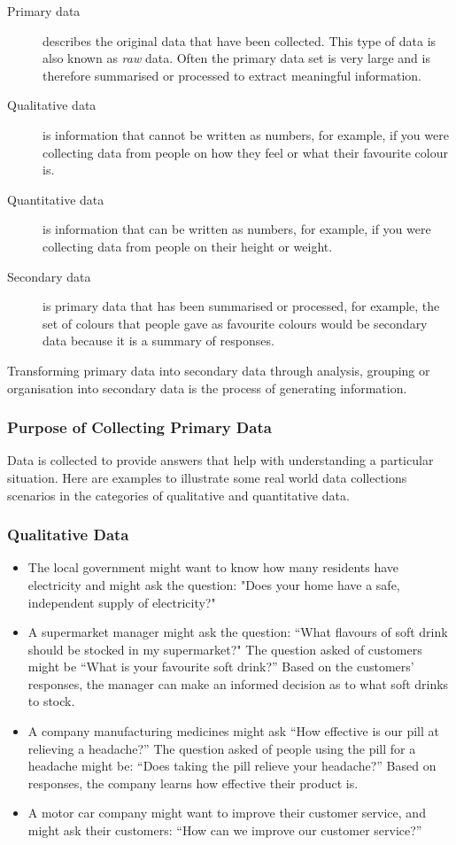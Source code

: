 \documentclass[10pt,a4paper,titlepage,twoside,openright]{report}
\begin{document}
\begin{description}
\item[Primary data] describes the original data that have been collected. This type of data is also known as \textit{raw} data. Often the primary data set is very large and is therefore summarised or processed to extract meaningful information.
\item[Qualitative data] is information that cannot be written as numbers, for example, if you were collecting data from people on how they feel or what their favourite colour is.
\item[Quantitative data] is information that can be written as numbers, for example, if you were collecting data from people on their height or weight.
\item[Secondary data] is primary data that has been summarised or processed, for example, the set of colours that people gave as favourite colours would be secondary data because it is a summary of responses.
\end{description}

Transforming primary data into secondary data through analysis, grouping or organisation into secondary data is the process of generating information.

\subsubsection{Purpose of Collecting Primary Data}
\label{mdat:s:dataexamples}
Data is collected to provide answers that help with understanding a particular situation. Here are examples to illustrate some real world data collections scenarios in the categories of qualitative and quantitative data.

\subsubsection*{Qualitative Data}

\begin{itemize}
\item The local government might want to know how many residents have electricity and might ask the question: "Does your home have a safe, independent supply of electricity?"
\item A supermarket manager might ask the question: ``What flavours of soft drink should be stocked in my supermarket?" The question asked of customers might be ``What is your favourite soft drink?'' Based on the customers' responses, the manager can make an informed decision as to what soft drinks to stock.
\item A company manufacturing medicines might ask ``How effective is our pill at relieving a headache?'' The question asked of people using the pill for a headache might be: ``Does taking the pill relieve your headache?'' Based on responses, the company learns how effective their product is.
\item A motor car company might want to improve their customer service, and might ask their customers: ``How can we improve our customer service?''
\end{itemize}
\end{document}

